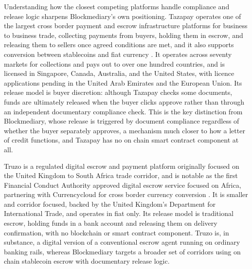 \documentclass[12pt, a4paper]{article}
\begin{document}
Understanding how the closest competing platforms handle compliance and release logic
sharpens Blockmediary's own positioning. Tazapay operates one of the largest cross border
payment and escrow infrastructure platforms for business to business trade, collecting
payments from buyers, holding them in escrow, and releasing them to sellers once agreed
conditions are met, and it also supports conversion between stablecoins and fiat currency
\citep{tazapay2025}. It operates across seventy markets for collections and pays out to
over one hundred countries, and is licensed in Singapore, Canada, Australia, and the
United States, with licence applications pending in the United Arab Emirates and the
European Union. Its release model is buyer discretion: although Tazapay checks some
documents, funds are ultimately released when the buyer clicks approve rather than through
an independent documentary compliance check. This is the key distinction from
Blockmediary, whose release is triggered by document compliance regardless of whether the
buyer separately approves, a mechanism much closer to how a letter of credit functions,
and Tazapay has no on chain smart contract component at all.

Truzo is a regulated digital escrow and payment platform originally focused on the United
Kingdom to South Africa trade corridor, and is notable as the first Financial Conduct
Authority approved digital escrow service focused on Africa, partnering with Currencycloud
for cross border currency conversion \citep{truzo2023}. It is smaller and corridor
focused, backed by the United Kingdom's Department for International Trade, and operates
in fiat only. Its release model is traditional escrow, holding funds in a bank account and
releasing them on delivery confirmation, with no blockchain or smart contract component.
Truzo is, in substance, a digital version of a conventional escrow agent running on
ordinary banking rails, whereas Blockmediary targets a broader set of corridors using on
chain stablecoin escrow with documentary release logic.
\end{document}
